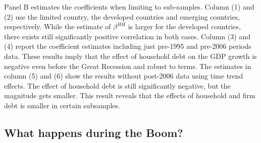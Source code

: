 \documentclass{ltjarticle}
\begin{document}
Panel B estimates the coefficients when limiting to sub-samples. Column (1) and (2) use the limited country, the developed countries and emerging countries, respectively. While the estimate of $\beta^{HH}$ is larger for the developed countries, there exists still significantly positive correlation in both cases. Column (3) and (4) report the coefficient estimates including just pre-1995 and pre-2006 periods data. These results imply that the effect of household debt on the GDP growth is negative even before the Great Recession and robust to terms. The estimates in column (5) and (6) show the results without post-2006 data using time trend effects. The effect of household debt is still significantly negative, but the magnitude gets smaller. This result reveals that the effects of household and firm debt is smaller in certain subsamples. 

\subsection{What happens during the Boom?}
\end{document}
